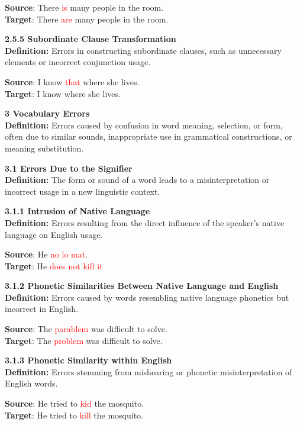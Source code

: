 \begin{tcolorbox}[breakable]
\textbf{Source}: There \textcolor{red}{is} many people in the room. \\
\textbf{Target}: There \textcolor{red}{are} many people in the room.


\noindent \textbf{2.5.5 Subordinate Clause Transformation}\\
\textbf{Definition:} Errors in constructing subordinate clauses, such as unnecessary elements or incorrect conjunction usage.


\textbf{Source}: I know \textcolor{red}{that} where she lives. \\
\textbf{Target}: I know where she lives.



\noindent \textbf{3 Vocabulary Errors}\\
\textbf{Definition:} Errors caused by confusion in word meaning, selection, or form, often due to similar sounds, inappropriate use in grammatical constructions, or meaning substitution.

\noindent \textbf{3.1 Errors Due to the Signifier}\\
\textbf{Definition:} The form or sound of a word leads to a misinterpretation or incorrect usage in a new linguistic context.

\noindent \textbf{3.1.1 Intrusion of Native Language}\\
\textbf{Definition:} Errors resulting from the direct influence of the speaker's native language on English usage.


\textbf{Source}: He \textcolor{red}{no lo mat}. \\
\textbf{Target}: He \textcolor{red}{does not kill it}


\noindent \textbf{3.1.2 Phonetic Similarities Between Native Language and English}\\
\textbf{Definition:} Errors caused by words resembling native language phonetics but incorrect in English.


\textbf{Source}: The \textcolor{red}{parablem} was difficult to solve. \\
\textbf{Target}: The \textcolor{red}{problem} was difficult to solve.


\noindent \textbf{3.1.3 Phonetic Similarity within English}\\
\textbf{Definition:} Errors stemming from mishearing or phonetic misinterpretation of English words.


\textbf{Source}: He tried to \textcolor{red}{kid} the mosquito. \\
\textbf{Target}: He tried to \textcolor{red}{kill} the mosquito.



\end{tcolorbox}

